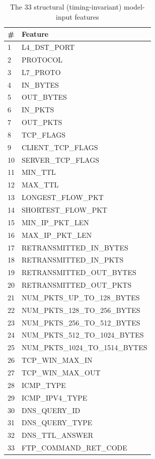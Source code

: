 \documentclass[12pt,a4paper]{report}
\begin{document}
\begin{table}[h]\centering
\caption{The 33 structural (timing-invariant) model-input features}
\begin{tabularx}{\linewidth}{XX}
\toprule
\textbf{\#} & \textbf{Feature} \\
\midrule
1 & L4\_DST\_PORT \\
2 & PROTOCOL \\
3 & L7\_PROTO \\
4 & IN\_BYTES \\
5 & OUT\_BYTES \\
6 & IN\_PKTS \\
7 & OUT\_PKTS \\
8 & TCP\_FLAGS \\
9 & CLIENT\_TCP\_FLAGS \\
10 & SERVER\_TCP\_FLAGS \\
11 & MIN\_TTL \\
12 & MAX\_TTL \\
13 & LONGEST\_FLOW\_PKT \\
14 & SHORTEST\_FLOW\_PKT \\
15 & MIN\_IP\_PKT\_LEN \\
16 & MAX\_IP\_PKT\_LEN \\
17 & RETRANSMITTED\_IN\_BYTES \\
18 & RETRANSMITTED\_IN\_PKTS \\
19 & RETRANSMITTED\_OUT\_BYTES \\
20 & RETRANSMITTED\_OUT\_PKTS \\
21 & NUM\_PKTS\_UP\_TO\_128\_BYTES \\
22 & NUM\_PKTS\_128\_TO\_256\_BYTES \\
23 & NUM\_PKTS\_256\_TO\_512\_BYTES \\
24 & NUM\_PKTS\_512\_TO\_1024\_BYTES \\
25 & NUM\_PKTS\_1024\_TO\_1514\_BYTES \\
26 & TCP\_WIN\_MAX\_IN \\
27 & TCP\_WIN\_MAX\_OUT \\
28 & ICMP\_TYPE \\
29 & ICMP\_IPV4\_TYPE \\
30 & DNS\_QUERY\_ID \\
31 & DNS\_QUERY\_TYPE \\
32 & DNS\_TTL\_ANSWER \\
33 & FTP\_COMMAND\_RET\_CODE \\
\bottomrule
\end{tabularx}
\end{table}
\end{document}
